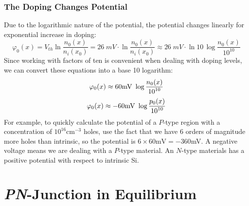 \subsubsection{The Doping Changes Potential}
Due to the logarithmic nature of the potential, the potential changes linearly for exponential increase in doping:
    \begin{equation} 
        \varphi _0(x) = V_{th} \ln \frac{n_0(x)}{n_i(x_0)} = 26\;mV \cdot \ln \frac{n_0(x)}{n_i(x_0)} 
        \approx 26\;mV \cdot \ln 10\,\log \frac{n_0(x)}{{10}^{10}} 
    \end{equation}
\newpage
Since working with factors of ten is convenient when dealing with doping levels, we can convert these equations into a base 10 logarithm:
    \begin{equation} 
        {\varphi _0}(x) \approx 60{\rm{mV}}\,\,\log \frac{{{n_0}(x)}}{{{{10}^{10}}}} 
    \end{equation}
    \begin{equation} 
        {\varphi _0}(x) \approx  - 60{\rm{mV}}\,\,\log \frac{{{p_0}(x)}}{{{{10}^{10}}}} 
    \end{equation}
For example, to quickly calculate the potential of a $P$-type region with a concentration of $10^{16} \mathrm{cm}^{-3}$ holes, use the fact that we have 6 orders of magnitude more holes than intrinsic, so the potential is $6 \times 60\mathrm{mV} = -360 $mV.  A negative voltage means we are dealing with a $P$-type material.  An $N$-type materials has a positive potential with respect to intrinsic Si.
\section{\emph{PN}-Junction in Equilibrium}
